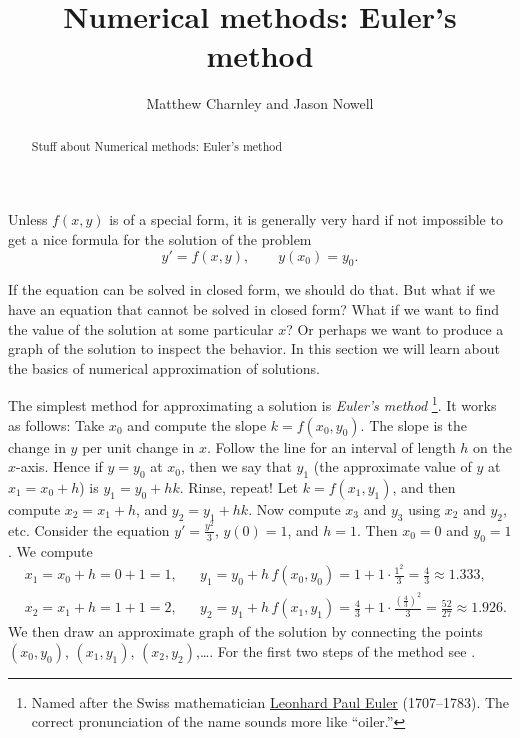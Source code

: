 \documentclass{ximera}
\title{Numerical methods: Euler's method}
\author{Matthew Charnley and Jason Nowell}
\begin{document}
\begin{abstract}
    Stuff about Numerical methods: Euler's method
\end{abstract}
\maketitle

\label{numer:section}



%


Unless $f(x,y)$ is of a special form, it is generally very hard if not impossible to get a nice formula for the solution of the problem
\begin{equation*}
    y' = f(x,y), \qquad y(x_0) = y_0 .
\end{equation*}

If the equation can be solved in closed form, we should do that. But what if we have an equation that cannot be solved in closed form? What if we want to find the value of the solution at some particular $x$? Or perhaps we want to produce a graph of the solution to inspect the behavior.  In this section we will learn about the basics of numerical approximation of solutions.

The simplest method for approximating a solution is \emph{Euler's method}%
\footnote{Named after the Swiss mathematician \href{https://en.wikipedia.org/wiki/Euler}{Leonhard Paul Euler} (1707--1783).  The correct pronunciation of the name sounds more like ``oiler.''}.  
It works as follows: Take $x_0$ and compute the slope $k = f(x_0,y_0)$.  The slope is the change in $y$ per unit change in $x$.  Follow the line for an interval of length $h$ on the $x$-axis.  Hence if $y = y_0$ at $x_0$, then we say that $y_1$ (the approximate value of $y$ at $x_1 = x_0 + h$) is $y_1 = y_0 + h k$. Rinse, repeat!  Let $k = f(x_1,y_1)$, and then compute $x_2 = x_1 + h$, and $y_2 = y_1 + h k$. Now compute $x_3$ and $y_3$ using $x_2$ and $y_2$, etc. Consider the equation $y' = \frac{y^2}{3}$, $y(0)=1$, and $h=1$. Then $x_0=0$ and $y_0 = 1$.  We compute
\begin{align*}
    & x_1 = x_0 + h = 0 + 1 = 1, & & y_1 = y_0 + h \, f(x_0,y_0) = 1 + 1 \cdot
    \frac{1^2}{3} = \frac{4}{3} \approx 1.333,\\
    & x_2 = x_1 + h = 1 + 1 = 2, & & y_2 = y_1 + h \, f(x_1,y_1) =
    \frac{4}{3} + 1 \cdot \frac{{(\frac{4}{3})}^2}{3} =
    \frac{52}{27} \approx 1.926.
\end{align*}
We then draw an approximate graph of the solution by connecting the points $(x_0,y_0)$, $(x_1,y_1)$, $(x_2,y_2)$,\dots. For the first two steps of the method see .
\end{document}
